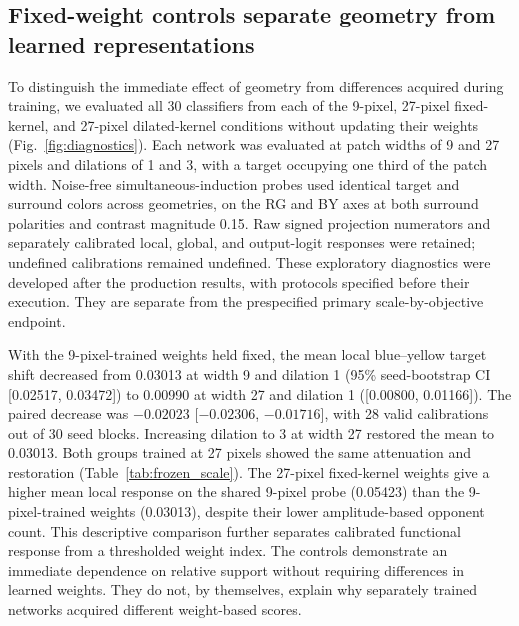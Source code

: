 \subsection{Fixed-weight controls separate geometry from learned representations}
\label{sec:frozen_scale_controls}

To distinguish the immediate effect of geometry from differences acquired during training, we evaluated all 30 classifiers from each of the 9-pixel, 27-pixel fixed-kernel, and 27-pixel dilated-kernel conditions without updating their weights (Fig.~\ref{fig:diagnostics}). Each network was evaluated at patch widths of 9 and 27 pixels and dilations of 1 and 3, with a target occupying one third of the patch width. Noise-free simultaneous-induction probes used identical target and surround colors across geometries, on the RG and BY axes at both surround polarities and contrast magnitude 0.15. Raw signed projection numerators and separately calibrated local, global, and output-logit responses were retained; undefined calibrations remained undefined. These exploratory diagnostics were developed after the production results, with protocols specified before their execution. They are separate from the prespecified primary scale-by-objective endpoint.

With the 9-pixel-trained weights held fixed, the mean local blue--yellow target shift decreased from 0.03013 at width 9 and dilation 1 (95\% seed-bootstrap CI [0.02517, 0.03472]) to 0.00990 at width 27 and dilation 1 ([0.00800, 0.01166]). The paired decrease was $-0.02023$ [$-0.02306$, $-0.01716$], with 28 valid calibrations out of 30 seed blocks. Increasing dilation to 3 at width 27 restored the mean to 0.03013. Both groups trained at 27 pixels showed the same attenuation and restoration (Table~\ref{tab:frozen_scale}). The 27-pixel fixed-kernel weights give a higher mean local response on the shared 9-pixel probe (0.05423) than the 9-pixel-trained weights (0.03013), despite their lower amplitude-based opponent count. This descriptive comparison further separates calibrated functional response from a thresholded weight index. The controls demonstrate an immediate dependence on relative support without requiring differences in learned weights. They do not, by themselves, explain why separately trained networks acquired different weight-based scores.

